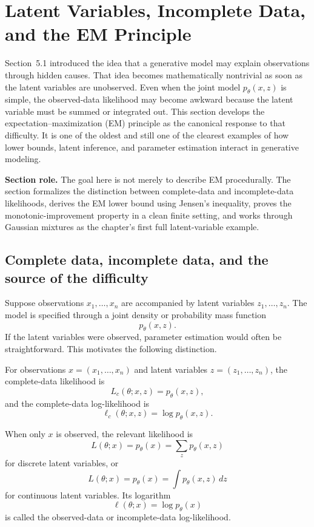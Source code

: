 \section{Latent Variables, Incomplete Data, and the EM Principle}

Section~5.1 introduced the idea that a generative model may explain observations through hidden causes.
That idea becomes mathematically nontrivial as soon as the latent variables are unobserved.
Even when the joint model $p_\theta(x,z)$ is simple, the observed-data likelihood may become awkward because the latent variable must be summed or integrated out.
This section develops the expectation--maximization (EM) principle as the canonical response to that difficulty.
It is one of the oldest and still one of the clearest examples of how lower bounds, latent inference, and parameter estimation interact in generative modeling.

\medskip

\noindent
\textbf{Section role.}
The goal here is not merely to describe EM procedurally.
The section formalizes the distinction between complete-data and incomplete-data likelihoods, derives the EM lower bound using Jensen's inequality, proves the monotonic-improvement property in a clean finite setting, and works through Gaussian mixtures as the chapter's first full latent-variable example.

\subsection*{Complete data, incomplete data, and the source of the difficulty}

Suppose observations $x_1,\dots,x_n$ are accompanied by latent variables $z_1,\dots,z_n$.
The model is specified through a joint density or probability mass function
\[
p_\theta(x,z).
\]
If the latent variables were observed, parameter estimation would often be straightforward.
This motivates the following distinction.

\begin{definition}
For observations $x=(x_1,\dots,x_n)$ and latent variables $z=(z_1,\dots,z_n)$, the complete-data likelihood is
\[
L_c(\theta; x,z) = p_\theta(x,z),
\]
and the complete-data log-likelihood is
\[
\ell_c(\theta; x,z)=\log p_\theta(x,z).
\]
\end{definition}

\begin{definition}
When only $x$ is observed, the relevant likelihood is
\[
L(\theta; x)=p_\theta(x)=\sum_z p_\theta(x,z)
\]
for discrete latent variables, or
\[
L(\theta; x)=p_\theta(x)=\int p_\theta(x,z)\,dz
\]
for continuous latent variables.
Its logarithm
\[
\ell(\theta; x)=\log p_\theta(x)
\]
is called the observed-data or incomplete-data log-likelihood.
\end{definition}


